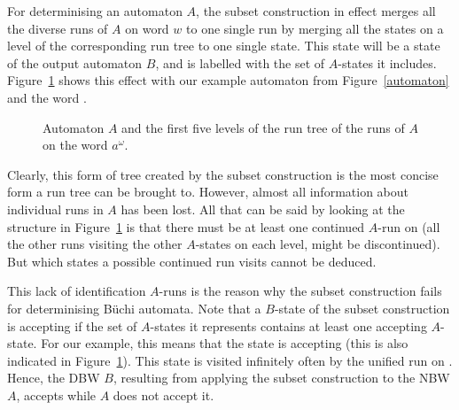 For determinising an automaton $A$, the subset construction in effect merges all the diverse runs of $A$ on word $w$ to one single run by merging all the states on a level of the corresponding run tree to one single state. This state will be a state of the output automaton $B$, and is labelled with the set of $A$-states it includes. Figure~\ref{subset_construction_tree} shows this effect with our example automaton from Figure~\ref{automaton} and the word \aom. 

\begin{figure}
\centering
\SubsetConstructionTree
\caption{Automaton $A$ and the first five levels of the run tree of the runs of $A$ on the word $a^\omega$.}
\label{subset_construction_tree}
\end{figure}

Clearly, this form of tree created by the subset construction is the most concise form a run tree can be brought to. However, almost all information about individual runs in $A$ has been lost. All that can be said by looking at the structure in Figure~\ref{subset_construction_tree} is that there must be at least one continued $A$-run on \aom (all the other runs visiting the other $A$-states on each level, might be discontinued). But which states a possible continued run visits cannot be deduced.

This lack of identification $A$-runs is the reason why the subset construction fails for determinising Büchi automata. Note that a $B$-state of the subset construction is accepting if the set of $A$-states it represents contains at least one accepting $A$-state. For our example, this means that the state  is accepting (this is also indicated in Figure~\ref{subset_construction_tree}). This state is visited infinitely often by the unified run on \aom. Hence, the DBW $B$, resulting from applying the subset construction to the NBW $A$, accepts \aom while $A$ does not accept it.


